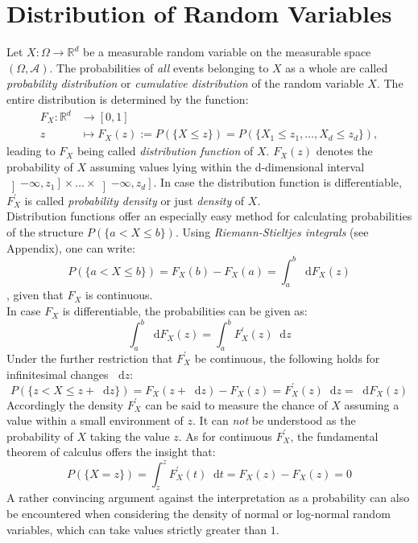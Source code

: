 \documentclass[12pt]{article}
\newcommand*\diff{\mathop{}\!\mathrm{d}}
\begin{document}
\section{Distribution of Random Variables}
Let $X: \Omega \to \mathbb{R}^d$ be a measurable random variable on the measurable space $(\Omega, \mathscr{A})$. The probabilities of \textit{all} events belonging to $X$ as a whole are called \textit{probability distribution} or \textit{cumulative distribution} of the random variable $X$. The entire distribution is determined by the function:
\begin{align}
F_X: \mathbb{R}^d &\to \left[ 0, 1\right] \\
z &\mapsto F_X(z):= P(\{X \leq z\}) = P(\{X_1 \leq z_1, \dots , X_d \leq z_d\}),
\end{align}
leading to $F_X$ being called \textit{distribution function} of $X$. $F_X(z)$ denotes the probability of $X$ assuming values lying within the d-dimensional interval $\left] - \infty , z_1\right] \times \dots \times \left] -\infty , z_d\right]$. In case the distribution function is differentiable, $F_X^{\prime}$ is called \textit{probability density} or just \textit{density} of $X$. \\
Distribution functions offer an especially easy method for calculating probabilities of the structure $P(\{ a < X \leq b\})$. Using \textit{Riemann-Stieltjes integrals} (see Appendix), one can write:
\[
P(\{ a < X \leq b\}) = F_X(b) - F_X(a) = \int_a^b \diff F_X(z)
\]
, given that $F_X$ is continuous. \\
In case $F_X$ is differentiable, the probabilities can be given as:
\[
\int_a^b \diff F_X(z) = \int_a^b F^{\prime}_X(z)\diff z
\]
Under the further restriction that $F_X^{\prime}$ be continuous, the following holds for infinitesimal changes $\diff z$:
\[
P(\{ z < X \leq z + \diff z\} ) = F_X(z + \diff z) - F_X(z) = F^{\prime}_X(z)\diff z = \diff F_X(z)
\]
Accordingly the density $F_X^{\prime}$ can be said to measure the chance  of $X$ assuming a value within a small environment of $z$. It can \textit{not} be understood as the probability of $X$ taking the value $z$. As for continuous $F_X^{\prime}$, the fundamental theorem of calculus offers the insight that:
\[
P(\{ X=z\}) = \int_z^z F_X^{\prime} (t)\diff t = F_X (z) - F_X(z) = 0
\]
A rather convincing argument against the interpretation as a probability can also be encountered when considering the density of normal or log-normal random variables, which can take values strictly greater than $1$. \\
\end{document}

